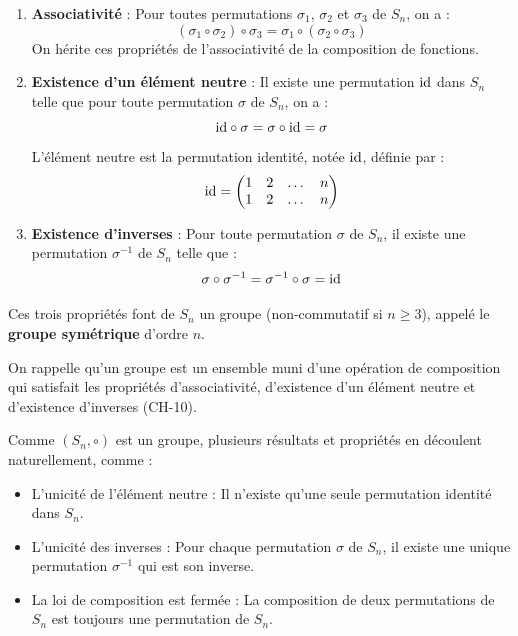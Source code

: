 \documentclass[12pt, a4paper]{report}
\begin{document}
\begin{property}
    \begin{enumerate}
        \item \textbf{Associativité} : Pour toutes permutations $\sigma_1$, $\sigma_2$ et $\sigma_3$ de $S_n$, on a :
        $$(\sigma_1 \circ \sigma_2) \circ \sigma_3 = \sigma_1 \circ (\sigma_2 \circ \sigma_3)$$
        On hérite ces propriétés de l'associativité de la composition de fonctions.
        \item \textbf{Existence d'un élément neutre} : Il existe une permutation $\mathrm{id}$ dans $S_n$ telle que pour toute permutation $\sigma$ de $S_n$, on a :
        $$\mathrm{id} \circ \sigma = \sigma \circ \mathrm{id} = \sigma$$
        L'élément neutre est la permutation identité, notée $\mathrm{id}$, définie par :
        $$\mathrm{id} = \left(\begin{matrix} 1 & 2 & \dots & n \\ 1 & 2 & \dots & n \end{matrix}\right)$$
        \item \textbf{Existence d'inverses} : Pour toute permutation $\sigma$ de $S_n$, il existe une permutation $\sigma^{-1}$ de $S_n$ telle que :
        $$\sigma \circ \sigma^{-1} = \sigma^{-1} \circ \sigma = \mathrm{id}$$
    \end{enumerate}
\end{property}

\begin{consequence}
    Ces trois propriétés font de $S_n$ un groupe (non-commutatif si $n \ge 3$), appelé le \textbf{groupe symétrique} d'ordre $n$.
\end{consequence}

On rappelle qu'un groupe est un ensemble muni d'une opération de composition qui satisfait les propriétés d'associativité, d'existence d'un élément neutre et d'existence d'inverses (CH-10).

Comme $(S_n, \circ)$ est un groupe, plusieurs résultats et propriétés en découlent naturellement, comme :
\begin{itemize}
    \item L'unicité de l'élément neutre : Il n'existe qu'une seule permutation identité dans $S_n$.
    \item L'unicité des inverses : Pour chaque permutation $\sigma$ de $S_n$, il existe une unique permutation $\sigma^{-1}$ qui est son inverse.
    \item La loi de composition est fermée : La composition de deux permutations de $S_n$ est toujours une permutation de $S_n$.
\end{itemize}
\end{document}
